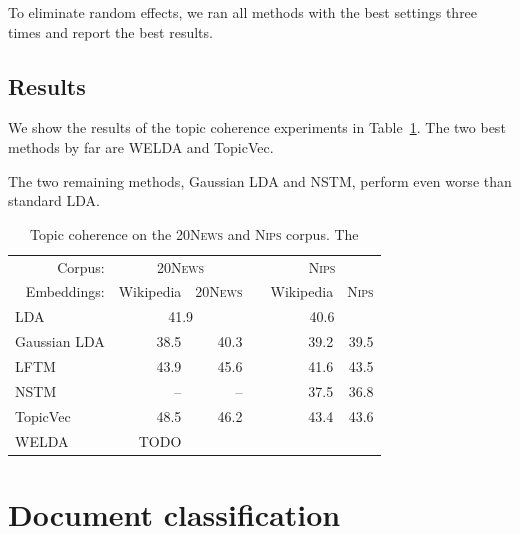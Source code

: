 \documentclass[
        a4paper,
        titlepage,
        twoside,
        parskip,
        numbers=noenddot
        ]{scrbook}
\newcommand{\ra}[1]{\renewcommand{\arraystretch}{#1}}
\theoremstyle{break}
\begin{document}
To eliminate random effects, we ran all methods with the best settings three times and report the best results.

\subsection{Results}
We show the results of the topic coherence experiments in Table~\ref{table:topic_coherence}.
The two best methods by far are WELDA and TopicVec.


The two remaining methods, Gaussian LDA and NSTM, perform even worse than standard LDA.

\begin{table}[]
  \ra{1.3}
  \centering
  \caption{Topic coherence on the \textsc{20News} and \textsc{Nips} corpus. The }
  \label{table:topic_coherence}
  \begin{tabular}{@{}lrrcrr@{}}
    \toprule
                 \multicolumn{1}{r}{Corpus:} & \multicolumn{2}{c}{\textsc{20News}} && \multicolumn{2}{c}{\textsc{Nips}} \\ \cmidrule{2-3} \cmidrule{5-6}
                 \multicolumn{1}{r}{Embeddings:}  & Wikipedia     & \textsc{20News}     && Wikipedia     & \textsc{Nips}     \\
                 \midrule
                              LDA          & \multicolumn{2}{c}{41.9}   && \multicolumn{2}{c}{40.6} \\
                              Gaussian LDA & 38.5          & 40.3       && 39.2          & 39.5     \\
                              LFTM         & 43.9          & 45.6       && 41.6          & 43.5     \\
                              NSTM         & --            & --         && 37.5          & 36.8     \\
                              TopicVec     & 48.5          & 46.2       && 43.4          & 43.6     \\
                              WELDA        & TODO          &            &&               &          \\
                              \bottomrule
  \end{tabular}
\end{table}

\section{Document classification}
\end{document}
